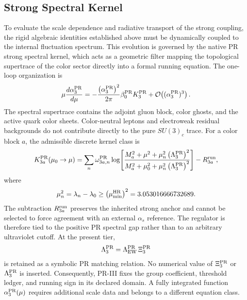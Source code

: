 \documentclass[11pt]{article}
\begin{document}
\subsection{Strong Spectral Kernel}
\label{subsec:priii-strong-spectral-kernel}
To evaluate the scale dependence and radiative transport of the strong coupling, the rigid algebraic identities established above must be dynamically coupled to the internal fluctuation spectrum. This evolution is governed by the native PR strong spectral kernel, which acts as a geometric filter mapping the topological supertrace of the color sector directly into a formal running equation. The one-loop organization is
\begin{equation}
\mu\frac{d\alpha_3^{\rm PR}}{d\mu}
=
-
\frac{\left(\alpha_3^{\rm PR}\right)^2}{2\pi}
\beta_0^{\rm PR}
K_3^{\rm PR}
+
\mathcal O\!\left((\alpha_3^{\rm PR})^3\right).
\label{eq:priii-strong-running-general}
\end{equation}
The spectral supertrace contains the adjoint gluon block, color ghosts, and the active quark color sheets.  Color-neutral leptons and electroweak residual backgrounds do not contribute directly to the pure \(SU(3)_c\) trace. For a color block \(a\), the admissible discrete kernel class is
\begin{equation}
K_{3a}^{\rm PR}(\mu_0\rightarrow\mu)
=
\sum_n\omega_{3a,n}^{\rm PR}
\log\!\left[
\frac{
M_a^2+\mu^2+\mu_n^2\left(\Lambda_3^{\rm PR}\right)^2
}{
M_a^2+\mu_0^2+\mu_n^2\left(\Lambda_3^{\rm PR}\right)^2
}
\right]
-
R_{3a}^{\rm run},
\label{eq:priii-strong-kernel}
\end{equation}
where
\begin{equation}
\mu_n^2
=
\lambda_n-\lambda_0
\geq
\left(\mu_{\min}^{\rm HR}\right)^2
=
3.053016666732689 .
\end{equation}
The subtraction \(R_{3a}^{\rm run}\) preserves the inherited strong anchor and cannot be selected to force agreement with an external \(\alpha_s\) reference.  The regulator is therefore tied to the positive PR spectral gap rather than to an arbitrary ultraviolet cutoff. At the present tier,
\begin{equation}
\Lambda_3^{\rm PR}
=
\Lambda_{\rm EW}^{\rm PR}\,\Xi_3^{\rm PR}
\end{equation}
is retained as a symbolic PR matching relation.  No numerical value of \(\Xi_3^{\rm PR}\) or \(\Lambda_3^{\rm PR}\) is inserted.  Consequently, PR-III fixes the group coefficient, threshold ledger, and running sign in its declared domain.  A fully integrated function \(\alpha_3^{\rm PR}(\mu)\) requires additional scale data and belongs to a different equation class.
\end{document}
